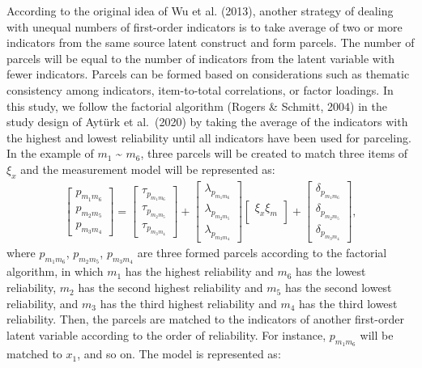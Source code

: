 \documentclass[
  11pt,
  man]{apa6}
\begin{document}
According to the original idea of Wu et al. (2013), another strategy of dealing with unequal numbers of first-order indicators is to take average of two or more indicators from the same source latent construct and form parcels. The number of parcels will be equal to the number of indicators from the latent variable with fewer indicators. Parcels can be formed based on considerations such as thematic consistency among indicators, item-to-total correlations, or factor loadings. In this study, we follow the factorial algorithm (Rogers \& Schmitt, 2004) in the study design of Aytürk et al.~(2020) by taking the average of the indicators with the highest and lowest reliability until all indicators have been used for parceling. In the example of \(m_{1}\) \textasciitilde{} \(m_{6}\), three parcels will be created to match three items of \(\xi_{x}\) and the measurement model will be represented as:
\begin{align}
    \begin{bmatrix}
        p_{m_{1}m_{6}} \\
        p_{m_{2}m_{5}} \\ 
        p_{m_{3}m_{4}}
    \end{bmatrix} =
    \begin{bmatrix}
        \tau_{p_{m_{1}m_{6}}} \\
        \tau_{p_{m_{2}m_{5}}} \\ 
        \tau_{p_{m_{3}m_{4}}}
    \end{bmatrix} +
    \begin{bmatrix}
        \lambda_{p_{m_{1}m_{6}}} \\
        \lambda_{p_{m_{2}m_{5}}} \\ 
        \lambda_{p_{m_{3}m_{4}}}
    \end{bmatrix}
    \begin{bmatrix}
        \xi_{x}\xi_{m} \\
    \end{bmatrix} +
    \begin{bmatrix}
        \delta_{p_{m_{1}m_{6}}} \\
        \delta_{p_{m_{2}m_{5}}} \\ 
        \delta_{p_{m_{3}m_{4}}}
    \end{bmatrix},
\end{align}
where \(p_{m_{1}m_{6}}\), \(p_{m_{2}m_{5}}\), \(p_{m_{3}m_{4}}\) are three formed parcels according to the factorial algorithm, in which \(m_{1}\) has the highest reliability and \(m_{6}\) has the lowest reliability, \(m_{2}\) has the second highest reliability and \(m_{5}\) has the second lowest reliability, and \(m_{3}\) has the third highest reliability and \(m_{4}\) has the third lowest reliability. Then, the parcels are matched to the indicators of another first-order latent variable according to the order of reliability. For instance, \(p_{m_{1}m_{6}}\) will be matched to \(x_{1}\), and so on. The model is represented as:
\end{document}
